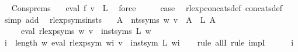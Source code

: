 \begin{isabellebody}
\ \isamarkupfalse%
\ Cons{\isachardot}{\kern0pt}prems\ {\isacharasterisk}{\kern0pt}\ \isamarkupfalse%
\ {\isachardoublequoteopen}eval\ f{}\ v\ {\isacharequal}{\kern0pt}\ L{}{\isachardoublequoteclose}\ \isamarkupfalse%
\ force\isanewline
\ \ \isamarkupfalse%
\ \isamarkupfalse%
\ {\isacharquery}{\kern0pt}case\ \isamarkupfalse%
\ rlexp{\isacharunderscore}{\kern0pt}concats{\isacharunderscore}{\kern0pt}def\ concats{\isacharunderscore}{\kern0pt}def\ \isamarkupfalse%
\ {\isacharparenleft}{\kern0pt}simp\ add{\isacharcolon}{\kern0pt}\ {\isachardoublequoteopen}{\isacharasterisk}{\kern0pt}{\isachardoublequoteclose}{\isacharparenright}{\kern0pt}\isanewline
{}\isamarkupfalse%
%
\endisatagproof
{\isafoldproof}%
%
\isadelimproof
\isanewline
%
\endisadelimproof
\isanewline
{}\isamarkupfalse%
\ rlexp{\isacharunderscore}{\kern0pt}syms{\isacharunderscore}{\kern0pt}insts{\isacharcolon}{\kern0pt}\isanewline
\ \ \ {\isachardoublequoteopen}{\isasymforall}A\ {\isasymin}\ nts{\isacharunderscore}{\kern0pt}syms\ w{\isachardot}{\kern0pt}\ v\ {\isacharparenleft}{\kern0pt}{\isasymgamma}{\isacharprime}{\kern0pt}\ A{\isacharparenright}{\kern0pt}\ {\isacharequal}{\kern0pt}\ L\ A{\isachardoublequoteclose}\isanewline
\ \ \ \ \ {\isachardoublequoteopen}eval\ {\isacharparenleft}{\kern0pt}rlexp{\isacharunderscore}{\kern0pt}syms\ w{\isacharparenright}{\kern0pt}\ v\ {\isacharequal}{\kern0pt}\ inst{\isacharunderscore}{\kern0pt}syms\ L\ w{\isachardoublequoteclose}\isanewline
%
\isadelimproof
%
\endisadelimproof
%
\isatagproof
{}\isamarkupfalse%
\ {\isacharminus}{\kern0pt}\isanewline
\ \ \isamarkupfalse%
\ {\isachardoublequoteopen}{\isasymforall}i\ {\isacharless}{\kern0pt}\ length\ w{\isachardot}{\kern0pt}\ eval\ {\isacharparenleft}{\kern0pt}rlexp{\isacharunderscore}{\kern0pt}sym\ {\isacharparenleft}{\kern0pt}w{\isacharbang}{\kern0pt}i{\isacharparenright}{\kern0pt}{\isacharparenright}{\kern0pt}\ v\ {\isacharequal}{\kern0pt}\ inst{\isacharunderscore}{\kern0pt}sym\ L\ {\isacharparenleft}{\kern0pt}w{\isacharbang}{\kern0pt}i{\isacharparenright}{\kern0pt}{\isachardoublequoteclose}\isanewline
\ \ \isamarkupfalse%
\ {\isacharparenleft}{\kern0pt}rule\ allI{\isacharcomma}{\kern0pt}\ rule\ impI{\isacharparenright}{\kern0pt}\isanewline
\ \ \ \ \isamarkupfalse%
\ i\isanewline
\ \ \ \ \isamarkupfalse%

\end{isabellebody}
